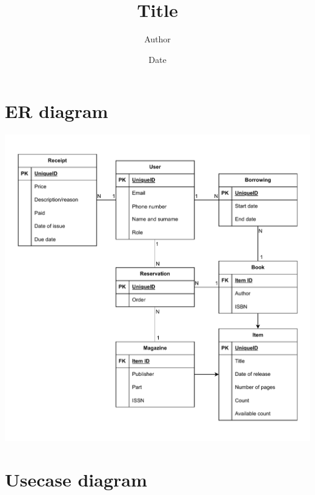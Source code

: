 \documentclass{article}
\title{Title}
\author{Author}
\date{Date}
\begin{document}
\section*{ER diagram}

\includegraphics*[width=1\textwidth]{assets/er.pdf}

\newpage

\section*{Usecase diagram}
\end{document}
